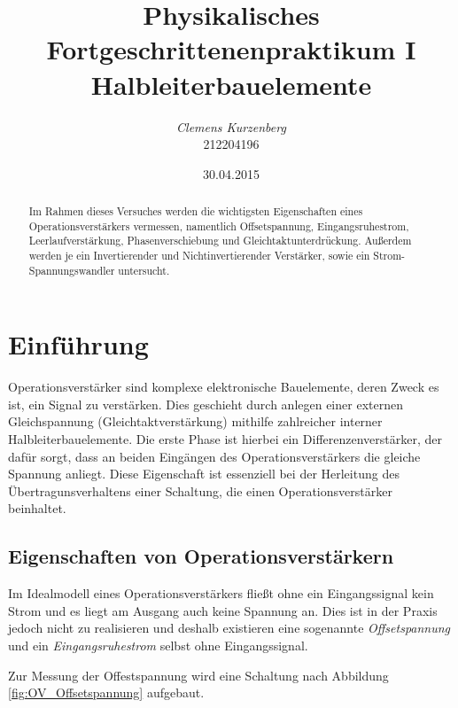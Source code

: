 \documentclass[10pt,a4paper]{scrartcl}
\title {Physikalisches Fortgeschrittenenpraktikum I\linebreak
Halbleiterbauelemente}
\author {\emph{Clemens Kurzenberg}\\212204196}
\date {30.04.2015}
\begin{document}
\maketitle

\begin{abstract}
    Im Rahmen dieses Versuches werden die wichtigsten Eigenschaften eines
    Operationsverstärkers vermessen,
    namentlich Offsetspannung, Eingangsruhestrom, Leerlaufverstärkung,
    Phasenverschiebung und Gleichtaktunterdrückung.
    Außerdem werden je ein Invertierender und Nichtinvertierender Verstärker,
    sowie ein Strom-Spannungswandler untersucht.
\end{abstract}

\tableofcontents

\pagebreak
\listoffigures
\listoftables

\pagebreak
\section {Einführung}


Operationsverstärker sind komplexe elektronische Bauelemente,
deren Zweck es ist, ein Signal zu verstärken.
Dies geschieht durch anlegen einer externen Gleichspannung
(Gleichtaktverstärkung)
mithilfe zahlreicher interner Halbleiterbauelemente.
Die erste Phase ist hierbei ein Differenzenverstärker,
der dafür sorgt,
dass an beiden Eingängen des Operationsverstärkers die gleiche Spannung anliegt.
Diese Eigenschaft ist essenziell bei der Herleitung des Übertragunsverhaltens
einer Schaltung,
die einen Operationsverstärker beinhaltet.


\subsection {Eigenschaften von Operationsverstärkern}

Im Idealmodell eines Operationsverstärkers fließt ohne ein Eingangssignal
kein Strom und es liegt am Ausgang auch keine Spannung an.
Dies ist in der Praxis jedoch nicht zu realisieren und deshalb
existieren eine sogenannte \emph{Offsetspannung} und
ein \emph{Eingangsruhestrom} selbst ohne Eingangssignal.

Zur Messung der Offestspannung wird eine Schaltung nach Abbildung
\ref{fig:OV_Offsetspannung} aufgebaut.
\end{document}
